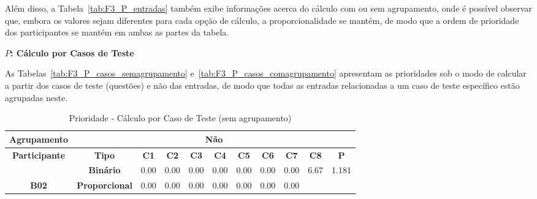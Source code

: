 Além disso, a Tabela~\ref{tab:F3_P_entradas} também exibe informações acerca do cálculo com ou sem agrupamento, onde é possível observar que, embora os valores sejam diferentes para cada opção de cálculo, a proporcionalidade se mantém, de modo que a ordem de prioridade dos participantes se mantém em ambas as partes da tabela.

\textbf{$P$: Cálculo por Casos de Teste}

As Tabelas~\ref{tab:F3_P_casos_semagrupamento} e~\ref{tab:F3_P_casos_comagrupamento} apresentam as prioridades sob o modo de calcular a partir dos casos de teste (questões) e não das entradas, de modo que todas as entradas relacionadas a um caso de teste específico estão agrupadas neste.

\begin{table}[htbp]
	\centering
	\caption{Prioridade - Cálculo por Caso de Teste (sem agrupamento)}
	\begin{tabular}{|c|cccccccccc|}
		\hline
		\cellcolor[HTML]{F2F2F2}\textbf{Agrupamento} &
		\multicolumn{10}{c|}{Não} \\ \hline
		\rowcolor[HTML]{D0CECE} 
		\textbf{Participante} &
		\multicolumn{1}{c|}{\cellcolor[HTML]{D0CECE}\textbf{Tipo}} &
		\multicolumn{1}{c|}{\cellcolor[HTML]{D0CECE}\textbf{C1}} &
		\multicolumn{1}{c|}{\cellcolor[HTML]{D0CECE}\textbf{C2}} &
		\multicolumn{1}{c|}{\cellcolor[HTML]{D0CECE}\textbf{C3}} &
		\multicolumn{1}{c|}{\cellcolor[HTML]{D0CECE}\textbf{C4}} &
		\multicolumn{1}{c|}{\cellcolor[HTML]{D0CECE}\textbf{C5}} &
		\multicolumn{1}{c|}{\cellcolor[HTML]{D0CECE}\textbf{C6}} &
		\multicolumn{1}{c|}{\cellcolor[HTML]{D0CECE}\textbf{C7}} &
		\multicolumn{1}{c|}{\cellcolor[HTML]{D0CECE}\textbf{C8}} &
		\textbf{P} \\ \hline
		&
		\multicolumn{1}{c|}{\textbf{Binário}} &
		\multicolumn{1}{c|}{0.00} &
		\multicolumn{1}{c|}{0.00} &
		\multicolumn{1}{c|}{0.00} &
		\multicolumn{1}{c|}{0.00} &
		\multicolumn{1}{c|}{0.00} &
		\multicolumn{1}{c|}{0.00} &
		\multicolumn{1}{c|}{0.00} &
		\multicolumn{1}{c|}{6.67} &
		1.181 \\ \cline{2-11} 
		\multirow{-2}{*}{\textbf{B02}} &
		\multicolumn{1}{c|}{\cellcolor[HTML]{F2F2F2}\textbf{Proporcional}} &
		\multicolumn{1}{c|}{\cellcolor[HTML]{F2F2F2}0.00} &
		\multicolumn{1}{c|}{\cellcolor[HTML]{F2F2F2}0.00} &
		\multicolumn{1}{c|}{\cellcolor[HTML]{F2F2F2}0.00} &
		\multicolumn{1}{c|}{\cellcolor[HTML]{F2F2F2}0.00} &
		\multicolumn{1}{c|}{\cellcolor[HTML]{F2F2F2}0.00} &
		\multicolumn{1}{c|}{\cellcolor[HTML]{F2F2F2}0.00} &
		\multicolumn{1}{c|}{\cellcolor[HTML]{F2F2F2}0.00} &

\end{tabular}
\end{table}
